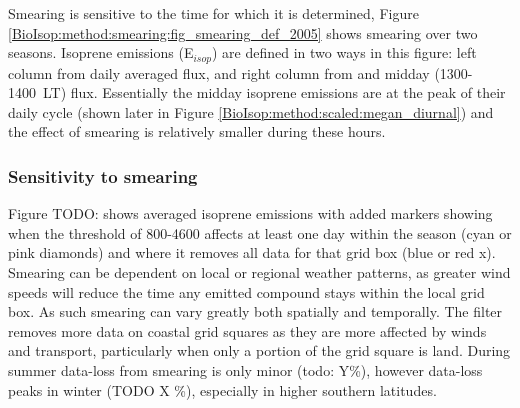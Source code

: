       Smearing is sensitive to the time for which it is determined, Figure \ref{BioIsop:method:smearing:fig_smearing_def_2005} shows smearing over two seasons.
      Isoprene emissions (E$_{isop}$) are defined in two ways in this figure: left column from daily averaged flux, and right column from and midday (1300-1400~LT) flux. 
      Essentially the midday isoprene emissions are at the peak of their daily cycle (shown later in Figure \ref{BioIsop:method:scaled:megan_diurnal}) and the effect of smearing is relatively smaller during these hours.
      
      
      
      
    
      
    \subsubsection{Sensitivity to smearing}
    
      
      Figure TODO: shows averaged isoprene emissions with added markers showing when the threshold of 800-4600 affects at least one day within the season (cyan or pink diamonds) and where it removes all data for that grid box (blue or red x).
      Smearing can be dependent on local or regional weather patterns, as greater wind speeds will reduce the time any emitted compound stays within the local grid box.
      As such smearing can vary greatly both spatially and temporally.
      The filter removes more data on coastal grid squares as they are more affected by winds and transport, particularly when only a portion of the grid square is land.
      During summer data-loss from smearing is only minor (todo: Y\%), however data-loss peaks in winter (TODO X \%), especially in higher southern latitudes.
      
